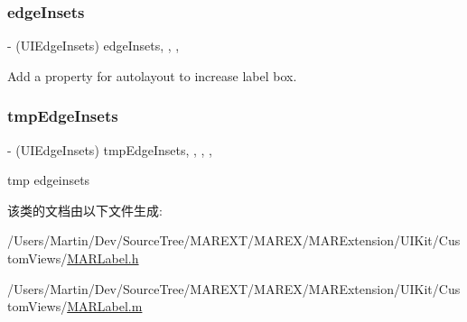 \subsubsection{\texorpdfstring{edge\+Insets}{edgeInsets}}
{\footnotesize\ttfamily -\/ (U\+I\+Edge\+Insets) edge\+Insets\hspace{0.3cm}{\ttfamily [read]}, {\ttfamily [write]}, {\ttfamily [nonatomic]}, {\ttfamily [assign]}}

Add a property for autolayout to increase label box. \mbox{\label{interface_m_a_r_label_accb0955121fd4e3eb098924b6252185d}} 
\subsubsection{\texorpdfstring{tmp\+Edge\+Insets}{tmpEdgeInsets}}
{\footnotesize\ttfamily -\/ (U\+I\+Edge\+Insets) tmp\+Edge\+Insets\hspace{0.3cm}{\ttfamily [read]}, {\ttfamily [write]}, {\ttfamily [nonatomic]}, {\ttfamily [assign]}, {\ttfamily [implementation]}}

tmp edgeinsets 

该类的文档由以下文件生成\+:\begin{DoxyCompactItemize}
\item 
/\+Users/\+Martin/\+Dev/\+Source\+Tree/\+M\+A\+R\+E\+X\+T/\+M\+A\+R\+E\+X/\+M\+A\+R\+Extension/\+U\+I\+Kit/\+Custom\+Views/\hyperlink{_m_a_r_label_8h}{M\+A\+R\+Label.\+h}\item 
/\+Users/\+Martin/\+Dev/\+Source\+Tree/\+M\+A\+R\+E\+X\+T/\+M\+A\+R\+E\+X/\+M\+A\+R\+Extension/\+U\+I\+Kit/\+Custom\+Views/\hyperlink{_m_a_r_label_8m}{M\+A\+R\+Label.\+m}\end{DoxyCompactItemize}
